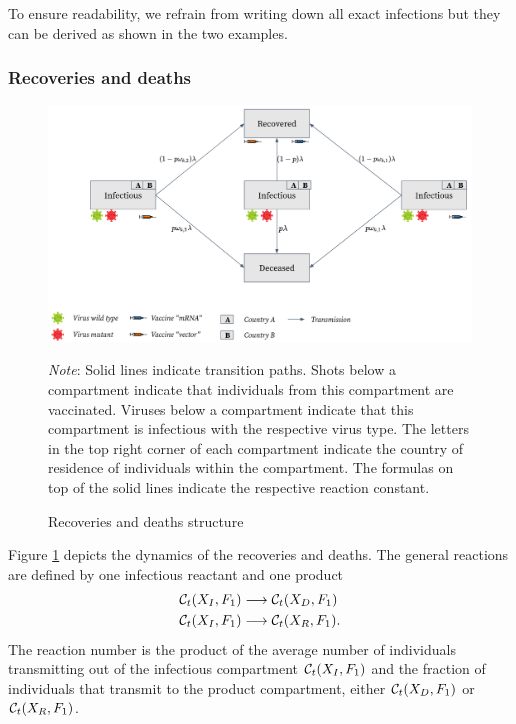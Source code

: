To ensure readability, we refrain from writing down all exact infections but they can be derived as shown in the two examples.

\subsubsection{Recoveries and deaths}
\begin{figure}[h!]
\centering
\includegraphics[scale=0.3]{images/overview_recovery.png}\\
\begin{flushleft}
\scriptsize{\textit{Note}: Solid lines indicate transition paths. Shots below a compartment indicate that individuals from this compartment are vaccinated. Viruses below a compartment indicate that this compartment is infectious with the respective virus type. The letters in the top right corner of each compartment indicate the country of residence of individuals within the compartment. The formulas on top of the solid lines indicate the respective reaction constant.}
\end{flushleft}
\caption{Recoveries and deaths structure}
\label{fig:model_recoveries}
\end{figure}
Figure \ref{fig:model_recoveries} depicts the dynamics of the recoveries and deaths. The general reactions are defined by one infectious reactant and one product
\begin{align}
\label{eq:recovery}
    \mathcal{C}_t(X_I, F_1) & \longrightarrow  \mathcal{C}_t(X_D, F_1) \\
    \mathcal{C}_t(X_I, F_1) & \longrightarrow  \mathcal{C}_t(X_R, F_1). \notag
\end{align}
The reaction number is the product of the average number of individuals transmitting out of the infectious compartment $\mathcal{C}_t(X_I, F_1)$ and the fraction of individuals that transmit to the product compartment, either $\mathcal{C}_t(X_D, F_1)$ or $\mathcal{C}_t(X_R, F_1)$. \\


